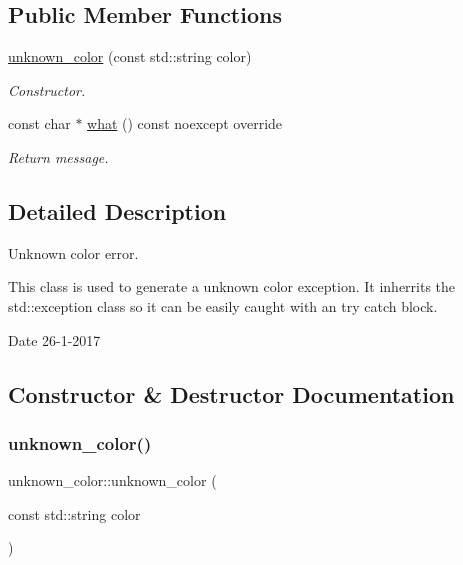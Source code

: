 \subsection*{Public Member Functions}
\begin{DoxyCompactItemize}
\item 
\hyperlink{classunknown__color_aef7c5513b511dd59ba1a3a58798966d3}{unknown\+\_\+color} (const std\+::string color)
\begin{DoxyCompactList}\small\item\em Constructor. \end{DoxyCompactList}\item 
const char $\ast$ \hyperlink{classunknown__color_a3340e3af5b5f734727b73ddf25df3265}{what} () const noexcept override
\begin{DoxyCompactList}\small\item\em Return message. \end{DoxyCompactList}\end{DoxyCompactItemize}


\subsection{Detailed Description}
Unknown color error. 

This class is used to generate a unknown color exception. It inherrits the std\+::exception class so it can be easily caught with an try catch block.

\begin{DoxyDate}{Date}
26-\/1-\/2017 
\end{DoxyDate}


\subsection{Constructor \& Destructor Documentation}
\mbox{\label{classunknown__color_aef7c5513b511dd59ba1a3a58798966d3}} 
\subsubsection{\texorpdfstring{unknown\+\_\+color()}{unknown\_color()}}
{\footnotesize\ttfamily unknown\+\_\+color\+::unknown\+\_\+color (\begin{DoxyParamCaption}\item[{const std\+::string}]{color }\end{DoxyParamCaption})\hspace{0.3cm}{\ttfamily [inline]}}



